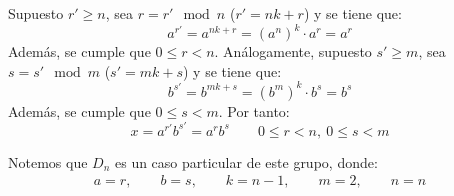 \begin{ejercicio}
\begin{enumerate}
        Supuesto $r'\geq n$, sea $r = r'\mod n$ ($r'=nk+r$) y se tiene que:
        \begin{equation*}
            a^{r'} = a^{nk + r} = (a^{n})^k \cdot a^r = a^r
        \end{equation*}
        Además, se cumple que $0\leq r < n$. Análogamente, supuesto $s'\geq m$, sea $s = s'\mod m$ ($s'=mk+s$) y se tiene que:
        \begin{equation*}
            b^{s'} = b^{mk + s} = (b^{m})^k \cdot b^s = b^s
        \end{equation*}
        Además, se cumple que $0\leq s < m$. Por tanto:
        \begin{equation*}
            x = a^{r'}b^{s'} = a^rb^s\qquad 0\leq r < n,\ 0\leq s < m
        \end{equation*}
    \end{enumerate}
    \begin{observacion}
        Notemos que $D_n$ es un caso particular de este grupo, donde:
        \begin{align*}
            a=r,\qquad b=s,\qquad k=n-1,\qquad m=2,\qquad n=n
        \end{align*}
    \end{observacion}
\end{ejercicio}

